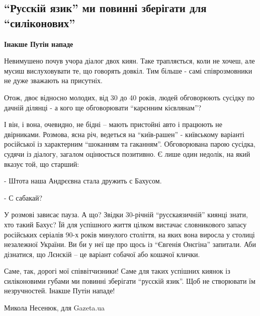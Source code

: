  
 
 
 
 

\subsection{\enquote{Русскій язик} ми повинні зберігати для \enquote{силіконових}}
\label{sec:20_11_2020.news.ua.gazeta.1.russki_jazyk_silikonovy}


\begin{leftbar}
	\bfseries
	Інакше Путін нападе
\end{leftbar}

Невимушено почув учора діалог двох киян. Таке трапляється, коли не хочеш, але
мусиш вислуховувати те, що говорять довкіл. Тим більше - самі співрозмовники не
дуже зважають на присутніх.

Отож, двоє відносно молодих, від 30 до 40 років, людей обговорюють сусідку по
дачній ділянці - а кого ще обговорювати \enquote{карєнним кієвлянам}?

І він, і вона, очевидно, не бідні – мають пристойні авто і працюють не
двірниками. Розмова, ясна річ, ведеться на \enquote{київ-рашен} - київському варіанті
російської із характерним \enquote{шоканням та гаканням}. Обговорювана парою сусідка,
судячи із діалогу, загалом оцінюється позитивно. Є лише один недолік, на який
вказує той, що старший:

- Штота наша Андрєєвна стала дружить с Бахусом.

- С сабакай?

У розмові зависає пауза. А що? Звідки 30-річній \enquote{русскаязичній} киянці знати,
хто такий Бахус? Їй для успішного життя цілком вистачає словникового запасу
російських серіалів 90-х років минулого століття, на яких вона виросла у
столиці незалежної України. Ви би у неї ще про щось із \enquote{Євгенія Онєгіна}
запитали. Аби дізнатися, що Лєнскій – це варіант собачої або кошачої клички.

Саме, так, дорогі мої співвітчизники! Саме для таких успішних киянок із
силіконовими губами ми повинні зберігати \enquote{русскій язик}. Щоб не створювати їм
незручностей. Інакше Путін нападе!

Микола Несенюк, для Gazeta.ua

